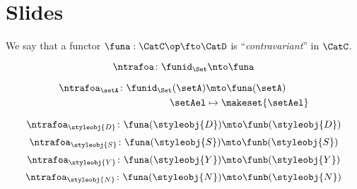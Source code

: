 
\section{Slides}

\begin{forslides}

    \begin{definition}
        \label{def:contravariant-functor}
        We say that a functor
        $
            \funa: \CatC \op \fto \CatD
        $
        is ``\emph{contravariant}'' in $\CatC$.
    \end{definition}

    \begin{equation}
        \label{eq:ex_nt_1}
        \ntrafoa \colon \funid_\Set \nto \funa
    \end{equation}

    \begin{equation}
        \label{eq:ex_nt_2}
        \begin{aligned}
            \ntrafoa_\setA \colon \funid_\Set(\setA) & \mto \funa(\setA) \\
            \setAel                                  & \mapsto \makeset{\setAel}
        \end{aligned}
    \end{equation}

    \begin{equation}
        \label{eq:eq_nt_3}
        \ntrafoa_{\styleobj{D}}\colon \funa(\styleobj{D}) \mto \funb(\styleobj{D})
    \end{equation}
    \begin{equation}
        \label{eq:eq_nt_4}
        \ntrafoa_{\styleobj{S}}\colon \funa(\styleobj{S}) \mto \funb(\styleobj{S})
    \end{equation}
    \begin{equation}
        \label{eq:eq_nt_5}
        \ntrafoa_{\styleobj{Y}}\colon \funa(\styleobj{Y}) \mto \funb(\styleobj{Y})
    \end{equation}
    \begin{equation}
        \label{eq:eq_nt_6}
        \ntrafoa_{\styleobj{N}}\colon \funa(\styleobj{N}) \mto \funb(\styleobj{N})
    \end{equation}


\end{forslides}
